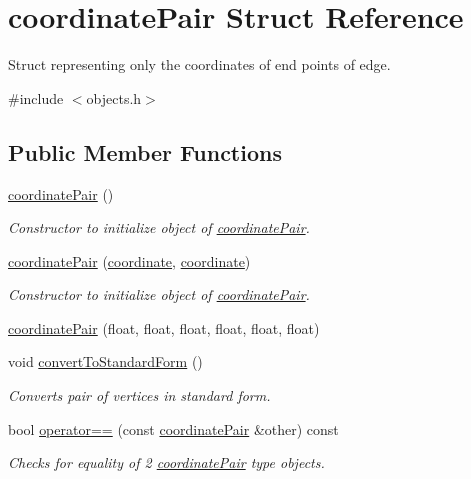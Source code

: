 \hypertarget{structcoordinate_pair}{}\section{coordinate\+Pair Struct Reference}
\label{structcoordinate_pair}


Struct representing only the coordinates of end points of edge.  




{\ttfamily \#include $<$objects.\+h$>$}

\subsection*{Public Member Functions}
\begin{DoxyCompactItemize}
\item 
\mbox{\hyperlink{structcoordinate_pair_aff1046f3c8d962d58ad159f5b2d8c66e}{coordinate\+Pair}} ()
\begin{DoxyCompactList}\small\item\em Constructor to initialize object of \mbox{\hyperlink{structcoordinate_pair}{coordinate\+Pair}}. \end{DoxyCompactList}\item 
\mbox{\hyperlink{structcoordinate_pair_a382dba7c330a0a050600f52ee2f16df1}{coordinate\+Pair}} (\mbox{\hyperlink{structcoordinate}{coordinate}}, \mbox{\hyperlink{structcoordinate}{coordinate}})
\begin{DoxyCompactList}\small\item\em Constructor to initialize object of \mbox{\hyperlink{structcoordinate_pair}{coordinate\+Pair}}. \end{DoxyCompactList}\item 
\mbox{\hyperlink{structcoordinate_pair_a7a428006c121bc4d437fefbe36b46824}{coordinate\+Pair}} (float, float, float, float, float, float)
\item 
void \mbox{\hyperlink{structcoordinate_pair_a28f2d157511e46858d4cd253973959dd}{convert\+To\+Standard\+Form}} ()
\begin{DoxyCompactList}\small\item\em Converts pair of vertices in standard form. \end{DoxyCompactList}\item 
bool \mbox{\hyperlink{structcoordinate_pair_accc2a54a4dd8c6fd10be4b384cc912a3}{operator==}} (const \mbox{\hyperlink{structcoordinate_pair}{coordinate\+Pair}} \&other) const
\begin{DoxyCompactList}\small\item\em Checks for equality of 2 \mbox{\hyperlink{structcoordinate_pair}{coordinate\+Pair}} type objects. \end{DoxyCompactList}\end{DoxyCompactItemize}
